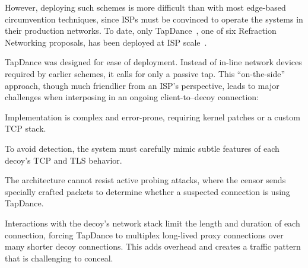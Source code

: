 \documentclass[letterpaper,twocolumn,10pt]{article}
\begin{document}
However, deploying such schemes is more difficult than with most
edge-based circumvention techniques, since ISPs must be convinced to
operate the systems in their production networks.  To date, only
TapDance~\cite{tapdance14}, one of six Refraction Networking
proposals, has been deployed at ISP scale~\cite{frolov2017isp}.

TapDance was designed for ease of deployment.
Instead of in-line network devices required by earlier schemes, it
calls for only a passive tap.
This ``on-the-side'' approach, though much friendlier from an ISP's
perspective, leads to major challenges when interposing in an ongoing
client-to--decoy connection:
\begin{compactitem}
\item Implementation is complex and error-prone, requiring kernel
  patches or a custom TCP stack.
\item To avoid detection, the system must carefully mimic
  subtle features of each decoy's TCP and TLS behavior.
\item The architecture cannot resist active probing attacks, where the
  censor sends specially crafted packets to determine whether a
  suspected connection is using TapDance.
\item Interactions with the decoy's network stack limit the length and
  duration of each connection, forcing TapDance to multiplex
  long-lived proxy connections over many shorter decoy
  connections. This adds overhead and creates a traffic pattern
  that is challenging to conceal.
\end{compactitem}



\end{document}
